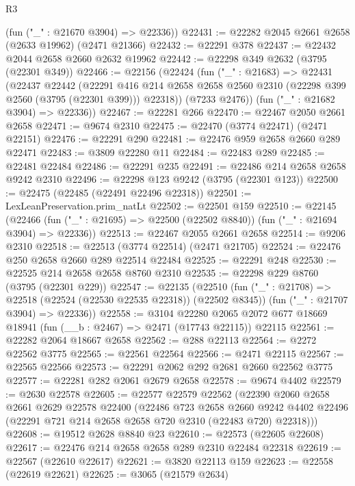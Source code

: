 \begin{lexlean}{R3}
\begin{coremodule}
      (fun ("_" : @21670 @3904) => @22336))
@22431 := @22282 @2045 @2661 @2658 (@2633 @19962) (@2471 @21366)
@22432 := @22291 @378
@22437 := @22432 @2044 @2658 @2660 @2632 @19962
@22442 := @22298 @349 @2632 (@3795 (@22301 @349))
@22466 := @22156
    (@22424
      (fun ("_" : @21683) =>
      @22431
        (@22437
          @22442
          (@22291
            @416
            @214
            @2658
            @2658
            @2560
            @2310
            (@22298 @399 @2560 (@3795 (@22301 @399)))
            @22318))
        (@7233 @2476))
      (fun ("_" : @21682 @3904) => @22336))
@22467 := @22281 @266
@22470 := @22467 @2050 @2661 @2658
@22471 := @9674 @2310
@22475 := @22470 (@3774 @22471) (@2471 @22151)
@22476 := @22291 @290
@22481 := @22476 @959 @2658 @2660 @289 @22471
@22483 := @3809 @22280 @11
@22484 := @22483 @289
@22485 := @22481 @22484
@22486 := @22291 @235
@22491 := @22486 @214 @2658 @2658 @9242 @2310
@22496 := @22298 @123 @9242 (@3795 (@22301 @123))
@22500 := @22475 (@22485 (@22491 @22496 @22318))
@22501 := LexLeanPreservation.prim_natLt
@22502 := @22501 @159
@22510 := @22145
    (@22466 (fun ("_" : @21695) => @22500 (@22502 @8840)) (fun ("_" : @21694 @3904) => @22336))
@22513 := @22467 @2055 @2661 @2658
@22514 := @9206 @2310
@22518 := @22513 (@3774 @22514) (@2471 @21705)
@22524 := @22476 @250 @2658 @2660 @289 @22514 @22484
@22525 := @22291 @248
@22530 := @22525 @214 @2658 @2658 @8760 @2310
@22535 := @22298 @229 @8760 (@3795 (@22301 @229))
@22547 := @22135
    (@22510
      (fun ("_" : @21708) => @22518 (@22524 (@22530 @22535 @22318)) (@22502 @8345))
      (fun ("_" : @21707 @3904) => @22336))
@22558 := @3104
    @22280
    @2065
    @2072
    @677
    @18669
    @18941
    (fun (__b : @2467) => @2471 (@17743 @22115))
    @22115
@22561 := @22282 @2064 @18667 @2658
@22562 := @288 @22113
@22564 := @2272 @22562 @3775
@22565 := @22561 @22564
@22566 := @2471 @22115
@22567 := @22565 @22566
@22573 := @22291 @2062 @292 @2681 @2660 @22562 @3775
@22577 := @22281 @282 @2061 @2679 @2658
@22578 := @9674 @4402
@22579 := @2630 @22578
@22605 := @22577
    @22579
    @22562
    (@22390
      @2060
      @2658
      @2661
      @2629
      @22578
      @22400
      (@22486
        @723
        @2658
        @2660
        @9242
        @4402
        @22496
        (@22291 @721 @214 @2658 @2658 @720 @2310 (@22483 @720) @22318)))
@22608 := @19512 @2628 @8840 @23
@22610 := @22573 (@22605 @22608)
@22617 := @22476 @214 @2658 @2658 @289 @2310 @22484 @22318
@22619 := @22567 (@22610 @22617)
@22621 := @3820 @22113 @159
@22623 := @22558 (@22619 @22621)
@22625 := @3065 (@21579 @2634)

\end{coremodule}
\end{lexlean}
